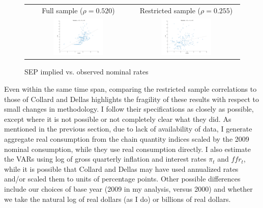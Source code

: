 \begin{figure}[t]
\centering
\begin{tabular}{cc}
Full sample ($\rho = 0.520$) & Restricted sample ($\rho = 0.255$) \\
\includegraphics[width=0.49\textwidth]{figs/nipa/scatter/nominal_sep} &
\includegraphics[width=0.49\textwidth]{figs/nipa/scatter/nominal_sep_collard} \\
\end{tabular}
\caption{SEP implied vs. observed nominal rates}
\label{nipa-full-vs-restricted-scatter}
\end{figure}

Even within the same time span, comparing the restricted sample correlations to those of Collard and Dellas highlights the fragility of these results with respect to small changes in methodology. I follow their specifications as closely as possible, except where it is not possible or not completely clear what they did. As mentioned in the previous section, due to lack of availability of data, I generate aggregate real consumption from the chain quantity indices scaled by the 2009 nominal consumption, while they use real consumption directly. I also estimate the VARs using log of gross quarterly inflation and interest rates $\pi_t$ and $ffr_t$, while it is possible that Collard and Dellas may have used annualized rates and/or scaled them to units of percentage points. Other possible differences include our choices of base year (2009 in my analysis, versus 2000) and whether we take the natural log of real dollars (as I do) or billions of real dollars.

